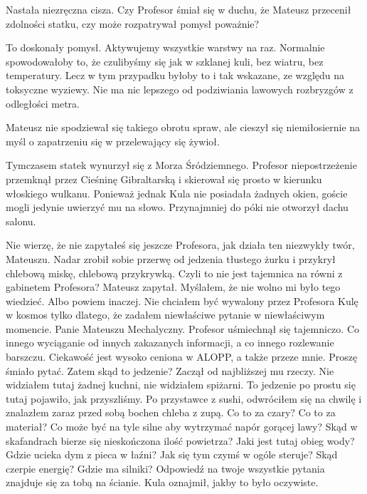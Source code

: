 Nastała niezręczna cisza. Czy Profesor śmiał się w duchu, że Mateusz przecenił zdolności statku, czy może rozpatrywał pomysł poważnie?

\begin{dialogue}
\ds{} To doskonały pomysł. Aktywujemy wszystkie warstwy na raz. Normalnie spowodowałoby to, że czulibyśmy się 
jak w szklanej kuli, bez wiatru, bez temperatury. Lecz w tym przypadku byłoby to i tak wskazane, ze względu na toksyczne wyziewy.
Nie ma nic lepszego od podziwiania lawowych rozbryzgów z odległości metra.
\end{dialogue}

Mateusz nie spodziewał się takiego obrotu spraw, ale cieszył się niemiłosiernie na myśl o zapatrzeniu się w przelewający się żywioł.

Tymczasem statek wynurzył się z Morza Śródziemnego. Profesor niepostrzeżenie przemknął przez Cieśninę Gibraltarską i skierował się prosto w kierunku włoskiego wulkanu.
Ponieważ jednak Kula nie posiadała żadnych okien, goście mogli jedynie uwierzyć mu na słowo. Przynajmniej do póki nie otworzył dachu salonu.

\begin{dialogue}
\ds{} Nie wierzę, że nie zapytałeś się jeszcze Profesora, jak działa ten niezwykły twór, Mateuszu. \dm{} Nadar zrobił sobie przerwę od jedzenia 
tłustego żurku i przykrył chlebową miskę, chlebową przykrywką.
\ds{} Czyli to nie jest tajemnica na równi z gabinetem Profesora? \dm{} Mateusz zapytał. \dm{} Myślałem, że nie wolno mi było tego wiedzieć.
Albo powiem inaczej. Nie chciałem być wywalony przez Profesora Kulę w kosmos tylko dlatego, że zadałem niewłaściwe pytanie w niewłaściwym momencie.
\ds{} Panie Mateuszu Mechalyczny. \dm{} Profesor uśmiechnął się tajemniczo. \dm{} Co innego wyciąganie od innych zakazanych informacji, a co innego rozlewanie barszczu. 
Ciekawość jest wysoko ceniona w ALOPP, a także przeze mnie. Proszę śmiało pytać.
\ds{} Zatem skąd to jedzenie? \dm{} Zaczął od najbliższej mu rzeczy. \dm{} Nie widziałem tutaj żadnej kuchni, nie widziałem spiżarni.
To jedzenie po prostu się tutaj pojawiło, jak przyszliśmy. Po przystawce z sushi, odwróciłem się na chwilę i znalazłem zaraz przed sobą bochen chleba z zupą.
Co to za czary? Co to za materiał? Co może być na tyle silne aby wytrzymać napór gorącej lawy? 
Skąd w skafandrach bierze się nieskończona ilość powietrza? Jaki jest tutaj obieg wody? 
Gdzie ucieka dym z pieca w łaźni? Jak się tym czymś w ogóle steruje? Skąd czerpie energię? Gdzie ma silniki?
\ds{} Odpowiedź na twoje wszystkie pytania znajduje się za tobą na ścianie. \dm{} Kula oznajmił, jakby to było oczywiste.
\end{dialogue}

